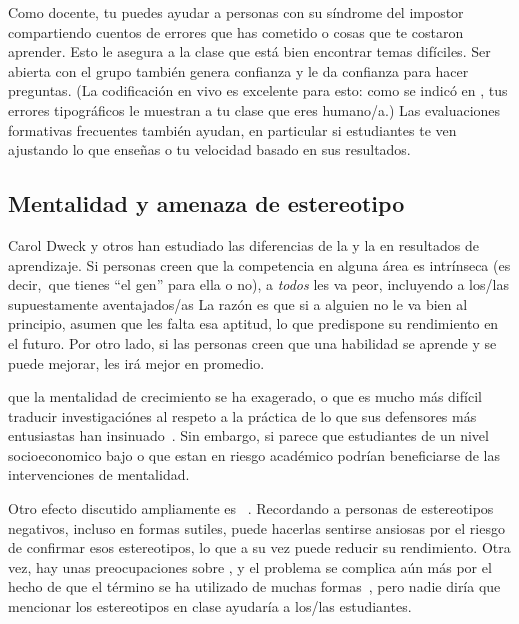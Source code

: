 Como docente,
tu puedes ayudar a personas con su síndrome del impostor
compartiendo cuentos de errores que has cometido o cosas que te costaron aprender.
Esto le asegura a la clase que está bien encontrar temas difíciles.
Ser abierta con el grupo también genera confianza
y le da confianza para hacer preguntas.
(La codificación en vivo es excelente para esto:
como se indicó en ,
tus errores tipográficos le muestran a tu clase que eres humano/a.)
Las evaluaciones formativas frecuentes también ayudan,
en particular si estudiantes te ven ajustando lo que enseñas o tu velocidad
basado en sus resultados.

\subsection*{Mentalidad y amenaza de estereotipo}

Carol Dweck y otros
han estudiado las diferencias de la 
y la  en resultados de aprendizaje.
Si personas creen que la competencia en alguna área es intrínseca
(es decir,\ que tienes ``el gen'' para ella o no),
a \emph{todos} les va peor,
incluyendo a los/las supuestamente aventajados/as
La razón es que si a alguien no le va bien al principio,
asumen que les falta esa aptitud,
lo que predispone su rendimiento en el futuro.
Por otro lado,
si las personas creen que una habilidad se aprende y se puede mejorar,
les irá mejor en promedio.

que la mentalidad de crecimiento se ha exagerado,
o que es mucho más difícil traducir investigaciónes al respeto a la práctica
de lo que sus defensores más entusiastas han insinuado~\cite{Sisk2018}.
Sin embargo,
si parece que estudiantes de un nivel socioeconomico bajo o que estan en riesgo académico podrían beneficiarse de las intervenciones de mentalidad.

Otro efecto discutido ampliamente es ~\cite{Stee2011}.
Recordando a personas de estereotipos negativos,
incluso en formas sutiles,
puede hacerlas sentirse ansiosas por el riesgo de confirmar esos estereotipos,
lo que a su vez puede reducir su rendimiento.
Otra vez,
hay unas preocupaciones sobre
,
y el problema se complica aún más por el hecho de que el término se ha utilizado de muchas formas~\cite{Shap2007},
pero nadie diría que mencionar los estereotipos en clase ayudaría a los/las estudiantes.

